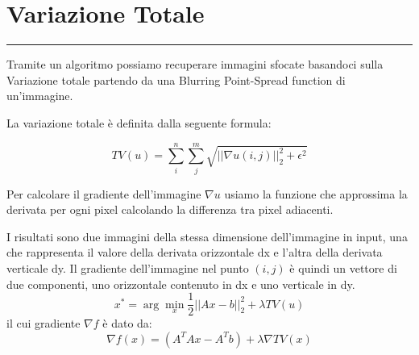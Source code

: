 {\color{rred}\section{Variazione Totale}}
\textcolor{rred}{\rule[5pt]{\textwidth}{1pt}}
Tramite un algoritmo possiamo recuperare immagini sfocate basandoci sulla Variazione totale partendo da una Blurring Point-Spread function di un'immagine. 

La variazione totale è definita dalla seguente formula:                                                                                

\[TV(u) = \sum_i^n{\sum_j^m{\sqrt{||\nabla u(i, j)||_2^2 + \epsilon^2}}}\]

Per calcolare il gradiente dell'immagine $\nabla u$ usiamo la funzione  che approssima la derivata per ogni pixel calcolando la differenza tra pixel adiacenti. 

I risultati sono due immagini della stessa dimensione dell'immagine in input, una che rappresenta il valore della derivata orizzontale dx e l'altra della derivata verticale dy. Il gradiente dell'immagine nel punto $(i, j)$ è quindi un vettore di due componenti, uno orizzontale contenuto in dx e uno verticale in dy.
\[x^* = \arg\min_x \frac{1}{2} ||Ax - b||_2^2 + \lambda TV(u)\] 
il cui gradiente $\nabla f$ è dato da: 
\[\nabla f(x) = (A^TAx - A^Tb)  + \lambda \nabla TV(x)\]

